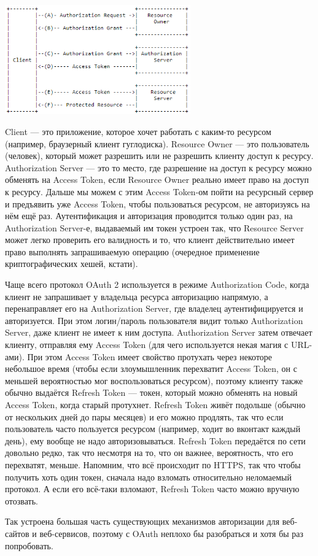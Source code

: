 \documentclass{../../text-style}
\begin{document}
\begin{center}
    \includegraphics[width=0.6\textwidth]{oauth.png}
\end{center}

Client --- это приложение, которое хочет работать с каким-то ресурсом (например, браузерный клиент гуглодиска). Resource Owner --- это пользователь (человек), который может разрешить или не разрешить клиенту доступ к ресурсу. Authorization Server --- это то место, где разрешение на доступ к ресурсу можно обменять на Access Token, если Resource Owner реально имеет право на доступ к ресурсу. Дальше мы можем с этим Access Token-ом пойти на ресурсный сервер и предъявить уже Access Token, чтобы пользоваться ресурсом, не авторизуясь на нём ещё раз. Аутентификация и авторизация проводится только один раз, на Authorization Server-е, выдаваемый им токен устроен так, что Resource Server может легко проверить его валидность и то, что клиент действительно имеет право выполнять запрашиваемую операцию (очередное применение криптографических хешей, кстати).

Чаще всего протокол OAuth 2 используется в режиме Authorization Code, когда клиент не запрашивает у владельца ресурса авторизацию напрямую, а перенаправляет его на Authorization Server, где владелец аутентифицируется и авторизуется. При этом логин/пароль пользователя видит только Authorization Server, даже клиент не имеет к ним доступа. Authorization Server затем отвечает клиенту, отправляя ему Access Token (для чего используется некая магия с URL-ами). При этом Access Token имеет свойство протухать через некоторе небольшое время (чтобы если злоумышленник перехватит Access Token, он с меньшей вероятностью мог воспользоваться ресурсом), поэтому клиенту также обычно выдаётся Refresh Token --- токен, который можно обменять на новый Access Token, когда старый протухнет. Refresh Token живёт подольше (обычно от нескольких дней до пары месяцев) и его можно продлять, так что если пользователь часто пользуется ресурсом (например, ходит во вконтакт каждый день), ему вообще не надо авторизовываться. Refresh Token передаётся по сети довольно редко, так что несмотря на то, что он важнее, вероятность, что его перехватят, меньше. Напомним, что всё происходит по HTTPS, так что чтобы получить хоть один токен, сначала надо взломать относительно неломаемый протокол. А если его всё-таки взломают, Refresh Token часто можно вручную отозвать.

Так устроена большая часть существующих механизмов авторизации для веб-сайтов и веб-сервисов, поэтому с OAuth неплохо бы разобраться и хотя бы раз попробовать.
\end{document}
